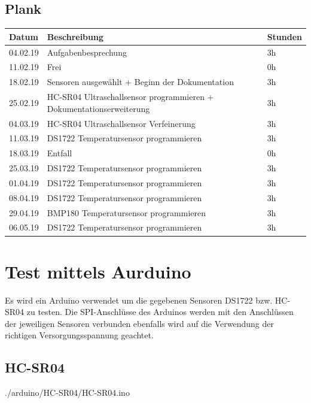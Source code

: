 \documentclass[12pt,a4paper,german]{article}
\begin{document}
\subsection{Plank}
\begin{table}[H]
\centering 
\begin{tabularx}{\textwidth}{|l|X|l|}
\hline
\textbf{Datum} & \textbf{Beschreibung} & \textbf{Stunden} \\ 
\hline
\hline
04.02.19 & Aufgabenbesprechung & 3h \\ 
\hline
11.02.19 & Frei & 0h \\ 
\hline
18.02.19 & Sensoren ausgewählt + Beginn der Dokumentation & 3h \\ 
\hline
25.02.19 & HC-SR04 Ultraschallsensor programmieren + Dokumentationserweiterung & 3h \\ 
\hline
04.03.19 & HC-SR04 Ultraschallsensor Verfeinerung& 3h \\ 
\hline
11.03.19 & DS1722 Temperatursensor programmieren & 3h \\ 
\hline
18.03.19 & Entfall & 0h\\ 
\hline
25.03.19 & DS1722 Temperatursensor programmieren & 3h \\ 
\hline
01.04.19 & DS1722 Temperatursensor programmieren & 3h \\ 
\hline
08.04.19 & DS1722 Temperatursensor programmieren & 3h \\ 
\hline
29.04.19 & BMP180 Temperatursensor programmieren & 3h \\ 
\hline
06.05.19 & DS1722 Temperatursensor programmieren & 3h \\ 
\hline
\hline
\end{tabularx}
\end{table}


\section{Test mittels Aurduino}

Es wird ein Arduino verwendet um die gegebenen Sensoren DS1722 bzw. HC-SR04 zu 
testen. Die SPI-Anschlüsse des Arduinos werden mit den Anschlüssen der
jeweiligen Sensoren verbunden ebenfalls wird auf die Verwendung der richtigen Versorgungsspannung geachtet.

\newpage
\subsection{HC-SR04}


 {./arduino/HC-SR04/HC-SR04.ino}
\end{document}
